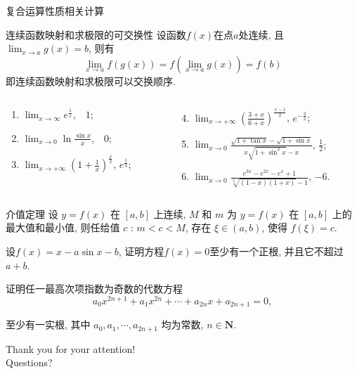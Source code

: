 \documentclass[
10pt,
aspectratio=43,
]{beamer}
\begin{document}
\begin{frame}{复合运算性质相关计算}
	\begin{block}{连续函数映射和求极限的可交换性}
		设函数$f(x)$在点$a$处连续, 且$\lim_{x\to a}g(x)=b$, 则有
		\[\lim_{x\to a}f(g(x))=f(\lim_{x\to a}g(x))=f(b)\]
		即连续函数映射和求极限可以交换顺序.
	\end{block}
	\pause
	\begin{block}{}
		\begin{columns}[onlytextwidth]
			\begin{column}{0.3\textwidth}
				\begin{enumerate}
					\item $\displaystyle \lim _{x \rightarrow \infty} e^{\frac{1}{x}}$, \pause\,\, $1$;\pause
					\item $\displaystyle \lim _{x \rightarrow 0} \ln \frac{\sin x}{x}$, \pause\,\, $0$;\pause
					\item $\displaystyle \lim _{x \rightarrow +\infty}\left(1+\frac{1}{x}\right)^{\frac{x}{2}}$,\pause  \,\,$e^\frac{1}{2}$;\pause
				\end{enumerate}
			\end{column}
			\begin{column}{0.55\textwidth}
				\begin{enumerate}
					\setcounter{enumi}{3}
					\item $\displaystyle \lim _{x \rightarrow +\infty}\left(\frac{3+x}{6+x}\right)^{\frac{x-1}{2}}$,\,\,\pause $e^{-\frac{3}{2}}$;\pause
					\item $\displaystyle \lim _{x \rightarrow 0} \frac{\sqrt{1+\tan x}-\sqrt{1+\sin x}}{x \sqrt{1+\sin ^2 x}-x}$,\,\,\pause $\displaystyle\frac{1}{2}$;\pause
					\item $\displaystyle \lim _{x \rightarrow 0} \frac{e^{3 x}-e^{2 x}-e^x+1}{\sqrt[3]{(1-x)(1+x)}-1}$,\,\,\pause $-6$.
				\end{enumerate}
			\end{column}
		\end{columns}
	\end{block}
\end{frame}

\begin{frame}
	\begin{block}{介值定理}
		设 $y=f(x)$ 在 $[a, b]$ 上连续, $M$ 和 $m$ 为 $y=f(x)$ 在 $[a, b]$ 上的最大值和最小值, 则任给值 $c$ : $m<c<M$, 存在 $\xi \in(a, b)$, 使得 $f(\xi)=c$.
	\end{block}
	\pause
	\begin{block}{}
		设$f(x)=x-a \sin x-b$, 证明方程$f(x)=0$至少有一个正根, 并且它不超过$a+b$.
	\end{block}
	\pause
	\begin{block}{}
		证明任一最高次项指数为奇数的代数方程
		$$
			a_0 x^{2 n+1}+a_1 x^{2 n}+\cdots+a_{2 n} x+a_{2 n+1}=0,
		$$

		至少有一实根, 其中 $a_0, a_1, \cdots, a_{2 n+1}$ 均为常数, $n \in \mathbf{N}$.
	\end{block}
\end{frame}

\begin{frame}[plain]
	\vfill
	\centering
	{
		\centering \Huge \color{white} Thank you for your attention!\\[10pt]Questions?\\
	}
	\vfill
\end{frame}
\end{document}
